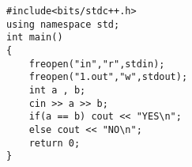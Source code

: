 \documentclass[E:/GsjzTle/main/main.tex]{subfiles}
\begin{document}
\begin{lstlisting}
#include<bits/stdc++.h>
using namespace std;
int main()
{
	freopen("in","r",stdin);
	freopen("1.out","w",stdout);
	int a , b;
	cin >> a >> b;
	if(a == b) cout << "YES\n";
	else cout << "NO\n";
	return 0;
}
\end{lstlisting}
\end{document}
